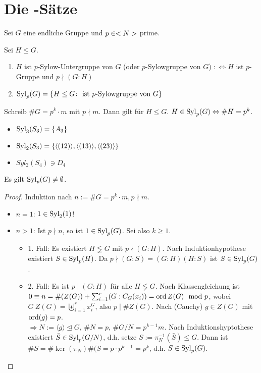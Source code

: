 \section{Die -Sätze}
Sei $G$ eine endliche Gruppe und $p \in <N>$ prime.
\begin{definition}
	Sei $H \leq G$.
	\begin{enumerate}
		\item $H$ ist $p$-Sylow-Untergruppe von $G$ (oder $p$-Sylowgruppe von $G$) $:\Leftrightarrow H$ ist $p$-Gruppe und $p \nmid (G \colon H)$
		\item $\operatorname{Syl}_p(G) = \{H \leq G \colon \text{ ist } p\text{-Sylowgruppe von } G\}$
	\end{enumerate}
\end{definition}

\begin{remark}
	Schreib $\#G = p^k \cdot m$ mit $p \nmid m$. Dann gilt für $H \leq G$. $H \in \operatorname{Syl}_p(G) \Leftrightarrow \#H=p^k$.
\end{remark}

\begin{example}
	\begin{itemize}
		\item $\operatorname{Syl}_3(S_3) = \{A_3\}$
		\item $\operatorname{Syl}_2(S_3) = \{\langle(12)\rangle , \langle(13)\rangle, \langle(23)\rangle\}$
		\item $Syl_2(S_4) \ni D_4$
	\end{itemize}
\end{example}

\begin{proposition}
	Es gilt $\operatorname{Syl}_p(G) \neq \emptyset$.
\end{proposition}

\begin{proof}
	Induktion nach $n:=\#G=p^k\cdot m, p\nmid m.$
	\begin{itemize}
		\item $n=1$: $1 \in \operatorname{Syl}_2(1)$!
		\item $n>1$: Ist $p\nmid n$, so ist $1 \in \operatorname{Syl}_p(G)$. Sei also $k \geq 1$.
		\begin{itemize}
			\item 1. Fall: Es existiert $H \lneqq G$ mit $p \nmid (G:H)$. Nach Induktionhypothese existiert $S \in \operatorname{Syl}_p(H)$. Da $p \nmid (G:S)=(G:H)(H:S)$ ist $S \in \operatorname{Syl}_p(G)$.
			\item 2. Fall: Es ist $p \mid (G:H)$ für alle $H \lneqq G$. Nach Klassengleichung  ist $0 \equiv n = \#(Z(G)) + \sum_{i=1}^{r} (G:C_G(x_i)) = \operatorname{ord}{Z(G)} \mod p$, wobei $G \ Z(G) = \biguplus_{i=1}^{r}x_i^G$, also $p \mid \#Z(G)$. Nach  (Cauchy) $g \in Z(G)$ mit $\operatorname{ord}(g) = p$. \\
			$\Rightarrow N:=\langle g \rangle \unlhd G$, $\#N = p$, $\# G /N = p^{k-1}m$. Nach Induktionshyptothese existiert $\bar{S}\in \operatorname{Syl}_p(G/N)$, d.h. setze $S:= \pi_N^{-1}(\bar{S}) \leq G$. Dann ist $\#S = \#\ker(\pi_N)\#\bar{(S}=p\cdot p^{k-1} = p^k$, d.h. $S \in \operatorname{Syl}_p(G)$.
		\end{itemize}
	\end{itemize}
\end{proof}

